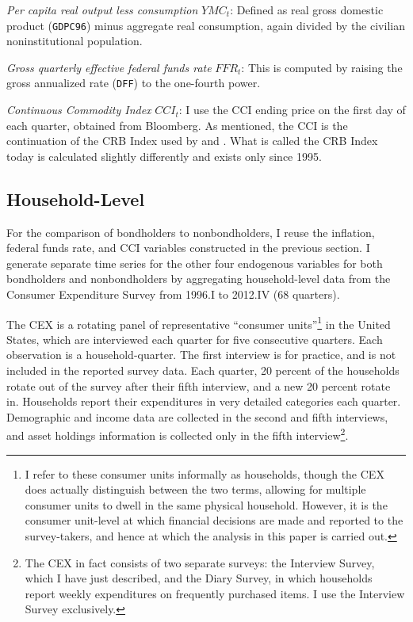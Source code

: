 \textit{Per capita real output less consumption} $YMC_t$: Defined as real gross domestic product (\texttt{GDPC96}) minus aggregate real consumption, again divided by the civilian noninstitutional population.

\textit{Gross quarterly effective federal funds rate} $FFR_t$: This is computed by raising the gross annualized rate (\texttt{DFF}) to the one-fourth power.

\textit{Continuous Commodity Index} $CCI_t$: I use the CCI ending price on the first day of each quarter, obtained from Bloomberg. As mentioned, the CCI is the continuation of the CRB Index used by \cite{canzoneri07} and \cite{collard11}. What is called the CRB Index today is calculated slightly differently and exists only since 1995.



\subsection{Household-Level}
For the comparison of bondholders to nonbondholders, I reuse the inflation, federal funds rate, and CCI variables constructed in the previous section. I generate separate time series for the other four endogenous variables for both bondholders and nonbondholders by aggregating household-level data from the Consumer Expenditure Survey from 1996.I to 2012.IV (68 quarters).

The CEX is a rotating panel of representative ``consumer units''\footnote{I refer to these consumer units informally as households, though the CEX does actually distinguish between the two terms, allowing for multiple consumer units to dwell in the same physical household. However, it is the consumer unit-level at which financial decisions are made and reported to the survey-takers, and hence at which the analysis in this paper is carried out.} in the United States, which are interviewed each quarter for five consecutive quarters. Each observation is a household-quarter. The first interview is for practice, and is not included in the reported survey data. Each quarter, 20 percent of the households rotate out of the survey after their fifth interview, and a new 20 percent rotate in. Households report their expenditures in very detailed categories each quarter. Demographic and income data are collected in the second and fifth interviews, and asset holdings information is collected only in the fifth interview\footnote{The CEX in fact consists of two separate surveys: the Interview Survey, which I have just described, and the Diary Survey, in which households report weekly expenditures on frequently purchased items. I use the Interview Survey exclusively.}.

